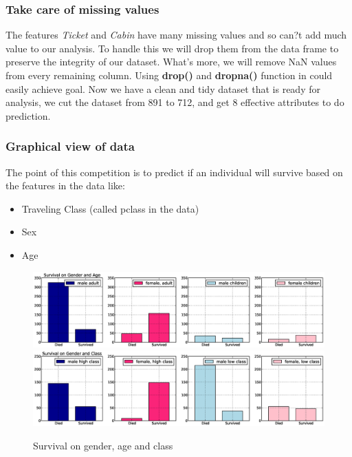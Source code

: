 \documentclass{article}
\begin{document}
\subsubsection{Take care of missing values}
The features \textit{Ticket} and \textit{Cabin} have many missing values and so can?t add much value to our analysis. To handle this we will drop them from the data frame to preserve the integrity of our dataset. What's more, we will remove NaN values from every remaining column. Using \textbf{drop()} and \textbf{dropna()} function in could easily achieve goal. Now we have a clean and tidy dataset that is ready for analysis, we cut the dataset from 891 to 712, and get 8 effective attributes to do prediction.

\subsubsection{Graphical view of data}
The point of this competition is to predict if an individual will survive based on the features in the data like:
\begin{itemize}
	\item Traveling Class (called pclass in the data)
	\item Sex
	\item Age
\end{itemize}




\begin{figure}[h]
\begin{flushleft}
\hspace*{-1.2in}
\includegraphics[scale=0.4]{eps/survival_gender_age.eps} %
\hspace*{-1.2in}
\includegraphics[scale=0.4]{eps/survival_gender_class.eps} 
\caption{Survival on gender, age and class}
\label {fig:test}
\end{flushleft}
\end{figure}
\end{document}
